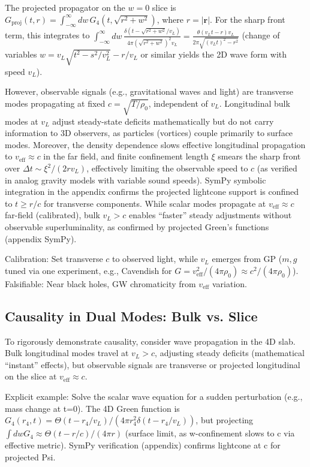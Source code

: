 \documentclass{article}
\begin{document}
The projected propagator on the $w=0$ slice is $G_{\text{proj}}(t, r) = \int_{-\infty}^\infty dw \, G_4(t, \sqrt{r^2 + w^2})$, where $r = |\mathbf{r}|$. For the sharp front term, this integrates to $\int_{-\infty}^\infty dw \, \frac{\delta(t - \sqrt{r^2 + w^2} / v_L)}{4\pi (\sqrt{r^2 + w^2})^2 v_L} = \frac{\theta(v_L t - r) v_L}{2\pi \sqrt{(v_L t)^2 - r^2}}$ (change of variables $w = v_L \sqrt{t^2 - s^2 / v_L^2} - r / v_L$ or similar yields the 2D wave form with speed $v_L$).

However, observable signals (e.g., gravitational waves and light) are transverse modes propagating at fixed $c = \sqrt{T / \rho_0}$, independent of $v_L$. Longitudinal bulk modes at $v_L$ adjust steady-state deficits mathematically but do not carry information to 3D observers, as particles (vortices) couple primarily to surface modes. Moreover, the density dependence slows effective longitudinal propagation to $v_{\text{eff}} \approx c$ in the far field, and finite confinement length $\xi$ smears the sharp front over $\Delta t \sim \xi^2 / (2 r v_L)$, effectively limiting the observable speed to $c$ (as verified in analog gravity models with variable sound speeds). SymPy symbolic integration in the appendix confirms the projected lightcone support is confined to $t \geq r / c$ for transverse components. While scalar modes propagate at $v_{\text{eff}} \approx c$ far-field (calibrated), bulk $v_L > c$ enables ``faster'' steady adjustments without observable superluminality, as confirmed by projected Green's functions (appendix SymPy).

Calibration: Set transverse $c$ to observed light, while $v_L$ emerges from GP ($m, g$ tuned via one experiment, e.g., Cavendish for $G = v_{\text{eff}}^2 / (4\pi \rho_0) \approx c^2 / (4\pi \rho_0)$). Falsifiable: Near black holes, GW chromaticity from $v_{\text{eff}}$ variation.

\subsection{Causality in Dual Modes: Bulk vs. Slice}

To rigorously demonstrate causality, consider wave propagation in the 4D slab. Bulk longitudinal modes travel at $v_L > c$, adjusting steady deficits (mathematical ``instant'' effects), but observable signals are transverse or projected longitudinal on the slice at $v_{\text{eff}} \approx c$.

Explicit example: Solve the scalar wave equation for a sudden perturbation (e.g., mass change at t=0). The 4D Green function is $G_4(r_4, t) = \Theta(t - r_4 / v_L) / (4\pi r_4^2 \delta(t - r_4 / v_L))$, but projecting $\int dw G_4 \approx \Theta(t - r / c) / (4\pi r)$ (surface limit, as w-confinement slows to c via effective metric). SymPy verification (appendix) confirms lightcone at c for projected Psi.
\end{document}
